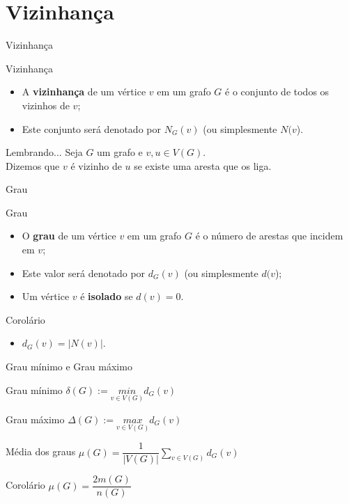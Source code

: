 \documentclass[xcolor=dvipsnames,table]{beamer}
\begin{document}
    \section{Vizinhança}
	\begin{frame}{Vizinhança}
		\begin{block}{Vizinhança}
			\begin{itemize}
				\item A {\bf vizinhança} de um vértice $v$ em um grafo $G$ é o conjunto de todos os vizinhos de $v$; \pause
				\item Este conjunto será denotado por $N_G(v)$ (ou simplesmente $N(v$).
			\end{itemize}
		\end{block} \pause
		\begin{exampleblock}{Lembrando...}
			Seja $G$ um grafo e $v, u \in V(G)$. \\Dizemos que $v$ é vizinho de $u$ se existe uma aresta que os liga.
		\end{exampleblock}
	\end{frame}
	
	\begin{frame}{Grau}
		\begin{block}{Grau}
			\begin{itemize}
				\item O {\bf grau} de um vértice $v$ em um grafo $G$ é o número de arestas que incidem em $v$; \pause
				\item Este valor será denotado por $d_G(v)$ (ou simplesmente $d(v$); \pause
				\item Um vértice $v$ é {\bf isolado} se $d(v) = 0$.
			\end{itemize}
		\end{block} \pause
		\begin{block}{Corolário}
			\begin{itemize}
				\item $d_G(v) = |N(v)|$.
			\end{itemize}
		\end{block}		
	\end{frame}
	
	\begin{frame}[shrink]{Grau mínimo e Grau máximo}
		\begin{block}{Grau mínimo}
			$\delta(G) :=  \underset{v \in V(G)}{min} d_G(v)$
		\end{block} \pause
		\begin{block}{Grau máximo}
			$\Delta(G) :=  \underset{v \in V(G)}{max} d_G(v)$
		\end{block} \pause
		\begin{block}{Média dos graus}
			$\mu(G) =  \dfrac{1}{|V(G)|} \underset{v \in V(G)}{\sum} d_G(v)$
		\end{block} \pause
		\begin{block}{Corolário}
			$\mu(G) = \dfrac{2m(G)}{n(G)}$
		\end{block}
	\end{frame}
	
\end{document}
